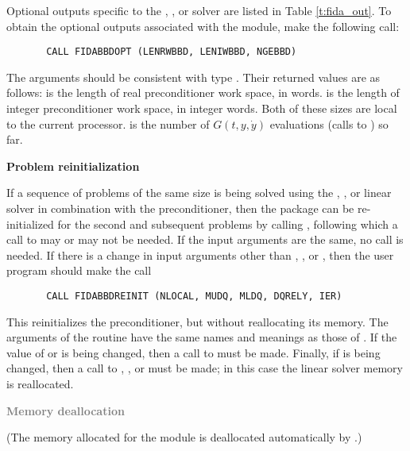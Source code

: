 \begin{Steps}
  Optional outputs specific to the {\spgmr}, {\spbcg}, or {\sptfqmr} solver are 
  listed in Table \ref{t:fida_out}.
  To obtain the optional outputs associated with the {\idabbdpre}
  module, make the following call:
\begin{verbatim}
       CALL FIDABBDOPT (LENRWBBD, LENIWBBD, NGEBBD)
\end{verbatim}
  The arguments should be consistent with {\C} type .  Their
  returned values are as follows:
   is the length of real preconditioner work space, in 
  words.   is the length of integer preconditioner work space, in
  integer words.  Both of these sizes are local to the current processor.
   is the number of $G(t,y,\dot{y})$ evaluations (calls to )
  so far.
  
\item {\bf Problem reinitialization}
  
  If a sequence of problems of the same size is being solved using the {\spgmr},
  {\spbcg}, or {\sptfqmr} linear solver in combination with the {\idabbdpre}
  preconditioner, then the {\ida} package can be re-initialized for the second
  and subsequent problems by calling , following which a call
  to  may or  may not be needed.
  If the input arguments are the same, no  call is needed.
  If there is a change in input arguments other than , , or
  , then the user program should make the call 
\begin{verbatim}
       CALL FIDABBDREINIT (NLOCAL, MUDQ, MLDQ, DQRELY, IER)
\end{verbatim}
  This reinitializes the {\idabbdpre} preconditioner, but without
  reallocating its memory.  The arguments of the 
  routine have the same names and meanings as those of .
  If the value of  or  is being changed, then a call to
   must be made.  Finally, if  is being  changed,
  then a call to , , or 
  must be made; in this case the linear solver memory is reallocated.

\item \textcolor{gray}{\bf Memory deallocation}

  (The memory allocated for the {\fidabbd} module is deallocated automatically
  by .)


\end{Steps}
